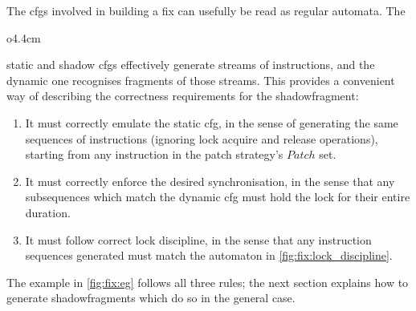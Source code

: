 The \glspl{cfg} involved in building a fix can usefully be read as
regular automata.  The
\begin{wrapfigure}{o}{4.4cm}
  \vspace{3pt}
\end{wrapfigure}
static and shadow \glspl{cfg} effectively generate streams of
instructions, and the dynamic one recognises fragments of those
streams.  This provides a convenient way of describing the correctness
requirements for the \gls{shadowfragment}:
\begin{enumerate}
\item It must correctly emulate the \gls{static cfg}, in the sense of
  generating the same sequences of instructions (ignoring lock acquire
  and release operations), starting from any instruction in the patch
  strategy's $\mathit{Patch}$ set.
\item It must correctly enforce the desired synchronisation, in the
  sense that any subsequences which match the \gls{dynamic cfg} must
  hold the lock for their entire duration.
\item It must follow correct lock discipline, in the sense that any
  instruction sequences generated must match the automaton in
  \autoref{fig:fix:lock_discipline}.
\end{enumerate}
The example in \autoref{fig:fix:eg} follows all three rules; the next
section explains how to generate \glspl{shadowfragment} which do so in
the general case.

